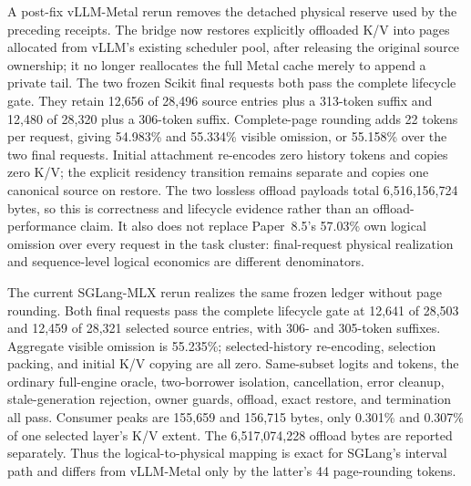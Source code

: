 \documentclass[11pt]{article}
\begin{document}
A post-fix vLLM-Metal rerun removes the detached physical reserve used by the
preceding receipts.  The bridge now restores explicitly offloaded K/V into
pages allocated from vLLM's existing scheduler pool, after releasing the
original source ownership; it no longer reallocates the full Metal cache merely
to append a private tail.  The two frozen Scikit final requests both pass the
complete lifecycle gate.  They retain 12,656 of 28,496 source entries plus a
313-token suffix and 12,480 of 28,320 plus a 306-token suffix.  Complete-page
rounding adds 22 tokens per request, giving 54.983\% and 55.334\% visible
omission, or 55.158\% over the two final requests.  Initial attachment
re-encodes zero history tokens and copies zero K/V; the explicit residency
transition remains separate and copies one canonical source on restore.  The
two lossless offload payloads total 6,516,156,724 bytes, so this is correctness
and lifecycle evidence rather than an offload-performance claim.  It also does
not replace Paper~8.5's 57.03\% own logical omission over every request in the
task cluster: final-request physical realization and sequence-level logical
economics are different denominators.

The current SGLang-MLX rerun realizes the same frozen ledger without page
rounding.  Both final requests pass the complete lifecycle gate at 12,641 of
28,503 and 12,459 of 28,321 selected source entries, with 306- and 305-token
suffixes.  Aggregate visible omission is 55.235\%; selected-history
re-encoding, selection packing, and initial K/V copying are all zero.
Same-subset logits and tokens, the ordinary full-engine oracle, two-borrower
isolation, cancellation, error cleanup, stale-generation rejection, owner
guards, offload, exact restore, and termination all pass.  Consumer peaks are
155,659 and 156,715 bytes, only 0.301\% and 0.307\% of one selected layer's
K/V extent.  The 6,517,074,228 offload bytes are reported separately.  Thus
the logical-to-physical mapping is exact for SGLang's interval path and differs
from vLLM-Metal only by the latter's 44 page-rounding tokens.
\end{document}
